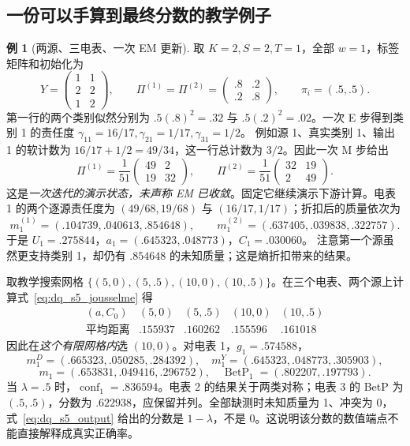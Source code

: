 \documentclass[UTF8,11pt,fontset=fandol,openany,oneside]{ctexbook}
\theoremstyle{definition}
\newtheorem{example}[theorem]{例}
\theoremstyle{remark}
\numberwithin{equation}{chapter}
\begin{document}
\subsection{一份可以手算到最终分数的教学例子}

\begin{example}[两源、三电表、一次 EM 更新]
取 $K=2,S=2,T=1$，全部 $w=1$，标签矩阵和初始化为
\[
 Y=\begin{pmatrix}1&1\\2&2\\1&2\end{pmatrix},\qquad
 \Pi^{(1)}=\Pi^{(2)}=\begin{pmatrix}.8&.2\\.2&.8\end{pmatrix},\qquad
 \pi_i=(.5,.5).
\]
第一行的两个类别似然分别为 $.5(.8)^2=.32$ 与 $.5(.2)^2=.02$。一次 E 步得到类别 1 的责任度
$\gamma_{11}=16/17,\gamma_{21}=1/17,\gamma_{31}=1/2$。
例如源 1、真实类别 1、输出 1 的软计数为 $16/17+1/2=49/34$，这一行总计数为 $3/2$。因此一次 M 步给出
\[
 \Pi^{(1)}=\frac1{51}\begin{pmatrix}49&2\\19&32\end{pmatrix},\qquad
 \Pi^{(2)}=\frac1{51}\begin{pmatrix}32&19\\2&49\end{pmatrix}.
\]
这是\emph{一次迭代的演示状态，未声称 EM 已收敛}。固定它继续演示下游计算。电表 1 的两个逐源责任度为
$(49/68,19/68)$ 与 $(16/17,1/17)$；折扣后的质量依次为
\[
 m_1^{(1)}=(.104739,.040613,.854648),\qquad
 m_1^{(2)}=(.637405,.039838,.322757).
\]
于是 $U_1=.275844$，$a_1=(.645323,.048773)$，$C_1=.030060$。
注意第一个源虽然更支持类别 1，却仍有 $.854648$ 的未知质量；这是熵折扣带来的结果。

取教学搜索网格 $\{(5,0),(5,.5),(10,0),(10,.5)\}$。在三个电表、两个源上计算式~\eqref{eq:dq_s5_jousselme} 得
\[
 \begin{array}{c|rrrr}
 (a,C_0)&(5,0)&(5,.5)&(10,0)&(10,.5)\\\hline
 \text{平均距离}&.155937&.160262&.155596&.161018
 \end{array}
\]
因此在\emph{这个有限网格内}选 $(10,0)$。对电表 1，$g_1=.574588$，
\[
 m_1^D=(.665323,.050285,.284392),\quad
 m_1^Y=(.645323,.048773,.305903),
\]
\[
 m_1=(.653831,.049416,.296752),\quad
 \operatorname{BetP}_1=(.802207,.197793).
\]
当 $\lambda=.5$ 时，$\operatorname{conf}_1=.836594$。电表 2 的结果关于两类对称；电表 3 的 BetP 为 $(.5,.5)$，分数为 $.622938$，应保留并列。全部缺测时未知质量为 1、冲突为 0，式~\eqref{eq:dq_s5_output} 给出的分数是 $1-\lambda$，不是 0。这说明该分数的数值端点不能直接解释成真实正确率。
\end{example}
\end{document}
